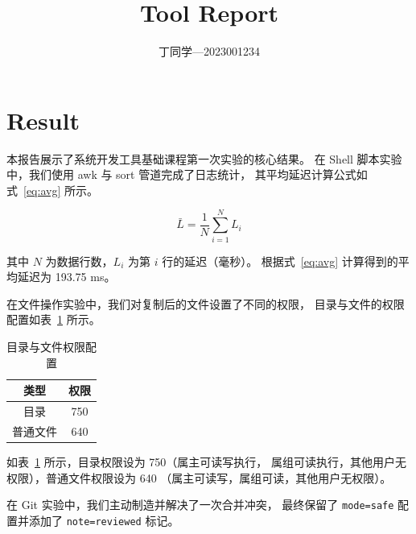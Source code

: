 \documentclass{article}
\begin{document}
\title{Tool Report}
\author{丁同学—2023001234}
\maketitle
\section{Result}

本报告展示了系统开发工具基础课程第一次实验的核心结果。
在 Shell 脚本实验中，我们使用 awk 与 sort 管道完成了日志统计，
其平均延迟计算公式如式~\eqref{eq:avg} 所示。

\begin{equation}
\bar{L} = \frac{1}{N} \sum_{i=1}^{N} L_i
\label{eq:avg}
\end{equation}

其中 $N$ 为数据行数，$L_i$ 为第 $i$ 行的延迟（毫秒）。
根据式~\eqref{eq:avg} 计算得到的平均延迟为 193.75 ms。

在文件操作实验中，我们对复制后的文件设置了不同的权限，
目录与文件的权限配置如表~\ref{tab:perm} 所示。

\begin{table}[h]
\centering
\caption{目录与文件权限配置}
\label{tab:perm}
\begin{tabular}{|c|c|}
\hline
类型 & 权限 \\
\hline
目录 & 750 \\
\hline
普通文件 & 640 \\
\hline
\end{tabular}
\end{table}

如表~\ref{tab:perm} 所示，目录权限设为 750（属主可读写执行，
属组可读执行，其他用户无权限），普通文件权限设为 640
（属主可读写，属组可读，其他用户无权限）。

在 Git 实验中，我们主动制造并解决了一次合并冲突，
最终保留了 \texttt{mode=safe} 配置并添加了 \texttt{note=reviewed} 标记。
\end{document}
